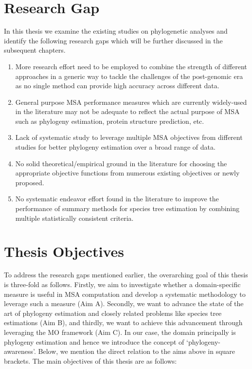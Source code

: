 \section{Research Gap}
In this thesis we examine the existing studies on phylogenetic analyses and identify the following research gaps which will be further discussed in the subsequent chapters.
\begin{enumerate}
	\item  More research effort need to be employed to combine the strength of different approaches in a generic way to tackle the challenges of the post-genomic era as no single method can provide high accuracy across different data. 
	
	
	\item  General purpose MSA performance measures which are currently widely-used in the literature may not be adequate to reflect the actual purpose of MSA such as phylogeny estimation, protein structure prediction, etc.
	
	
	\item  Lack of systematic study to leverage multiple MSA objectives from different studies for better phylogeny estimation over a broad range of data.
	
	
	\item  No solid theoretical/empirical ground in the literature for choosing the appropriate objective functions from numerous existing objectives  or newly proposed.
	
	
	\item No systematic endeavor effort found in the literature to improve the performance of summary methods for species tree estimation by combining multiple statistically consistent criteria.
	
	
\end{enumerate}

\section{Thesis Objectives}

To address the research gaps mentioned earlier, the overarching goal of this thesis is three-fold as follows. Firstly, we aim to investigate whether a domain-specific measure is useful in MSA computation and develop a systematic methodology to leverage such a measure (Aim A). Secondly, we want to advance the state of the art of phylogeny estimation and closely related problems like species tree estimations (Aim B), and thirdly, we want to achieve this advancement through leveraging the MO framework (Aim C). In our case, the domain principally is phylogeny estimation and hence we introduce the concept of ‘phylogeny-awareness’. Below, we mention the direct relation to the aims above in square brackets. The main objectives of this thesis are as follows:

